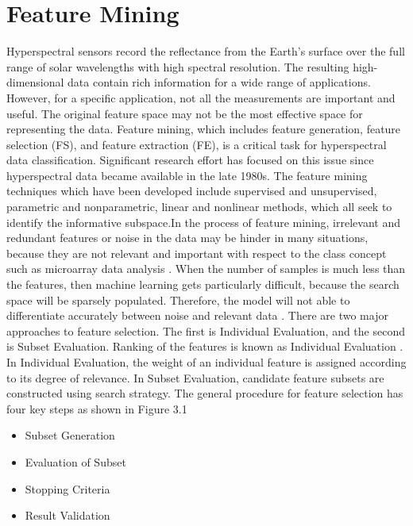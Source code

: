\documentclass[document.tex]{subfiles}
\begin{document}
\section{Feature Mining}
Hyperspectral sensors record the reflectance from the Earth's surface over the full range of solar wavelengths with high spectral resolution. The resulting high-dimensional data contain rich information for a wide range of applications. However, for a specific application, not all the measurements are important and useful. The original feature space may not be the most effective space for representing the data. Feature mining, which includes feature generation, feature selection (FS), and feature extraction (FE), is a critical task for hyperspectral data classification. Significant research effort has focused on this issue since hyperspectral data became available in the late 1980s. The feature mining techniques which have been developed include supervised and unsupervised, parametric and nonparametric, linear and nonlinear methods, which all seek to identify the informative subspace.In the process of feature mining, irrelevant and redundant features or noise in the data
may be hinder in many situations, because they are not relevant and important with respect to the class concept such as microarray data analysis . When the number of samples
is much less than the features, then machine learning gets particularly difficult, because
the search space will be sparsely populated. Therefore, the model will not able to differentiate accurately between noise and relevant data . There are two major approaches to
feature selection. The first is Individual Evaluation, and the second is Subset Evaluation.
Ranking of the features is known as Individual Evaluation . In Individual Evaluation,
the weight of an individual feature is assigned according to its degree of relevance. In
Subset Evaluation, candidate feature subsets are constructed using search strategy. The
general procedure for feature selection has four key steps as shown in Figure 3.1
\begin{itemize}
	\item Subset Generation
	\item Evaluation of Subset
	\item Stopping Criteria
	\item Result Validation
\end{itemize}
\end{document}
